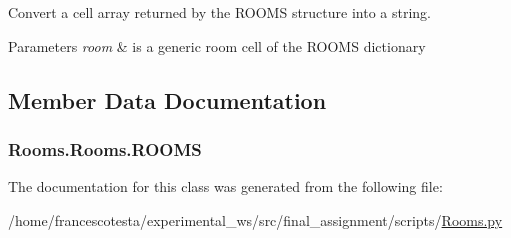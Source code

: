 Convert a cell array returned by the R\+O\+O\+MS structure into a string. 


\begin{DoxyParams}{Parameters}
{\em room} & is a generic room cell of the R\+O\+O\+MS dictionary \\
\hline
\end{DoxyParams}


\subsection{Member Data Documentation}
\subsubsection[{\texorpdfstring{R\+O\+O\+MS}{ROOMS}}]{\setlength{\rightskip}{0pt plus 5cm}Rooms.\+Rooms.\+R\+O\+O\+MS\hspace{0.3cm}{\ttfamily [static]}}\hypertarget{classRooms_1_1Rooms_a45a955141e4dd142491b43124c07ab95}{}\label{classRooms_1_1Rooms_a45a955141e4dd142491b43124c07ab95}


The documentation for this class was generated from the following file\+:\begin{DoxyCompactItemize}
\item 
/home/francescotesta/experimental\+\_\+ws/src/final\+\_\+assignment/scripts/\hyperlink{Rooms_8py}{Rooms.\+py}\end{DoxyCompactItemize}
